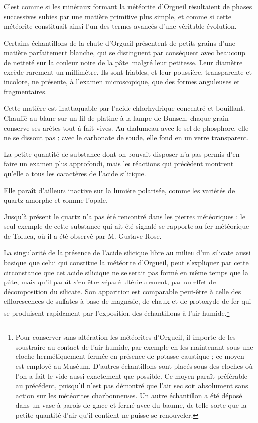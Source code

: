 \documentclass[a4paper, 11pt, oneside, polutonikogreek, french]{article}
\begin{document}
C'est comme si les minéraux formant la météorite d'Orgueil résultaient de phases successives subies par une matière primitive plus simple, et comme si cette météorite constituait ainsi l'un des termes avancés d'une véritable évolution.

Certains échantillons de la chute d'Orgueil présentent de petits grains d'une matière parfaitement blanche, qui se distinguent par conséquent avec beaucoup de netteté sur la couleur noire de la pâte, malgré leur petitesse. Leur diamètre excède rarement un millimètre. Ils sont friables, et leur poussière, transparente et incolore, ne présente, à l'examen microscopique, que des formes anguleuses et fragmentaires.

Cette matière est inattaquable par l'acide chlorhydrique concentré et bouillant. Chauffé au blanc sur un fil de platine à la lampe de Bunsen, chaque grain conserve ses arêtes tout à fait vives. Au chalumeau avec le sel de phosphore, elle ne se dissout pas ; avec le carbonate de soude, elle fond en un verre transparent.

La petite quantité de substance dont on pouvait disposer n'a pas permis d'en faire un examen plus approfondi, mais les réactions qui précèdent montrent qu'elle a tous les caractères de l'acide silicique.

Elle paraît d'ailleurs inactive sur la lumière polarisée, comme les variétés de quartz amorphe et comme l'opale.

Jusqu'à présent le quartz n'a pas été rencontré dans les pierres météoriques : le seul exemple de cette substance qui ait été signalé se rapporte au fer météorique de Toluca, où il a été observé par M. Gustave Rose.

La singularité de la présence de l'acide silicique libre au milieu d'un silicate aussi basique que celui qui constitue la météorite d'Orgueil, peut s'expliquer par cette circonstance que cet acide silicique ne se serait pas formé en même temps que la pâte, mais qu'il paraît s'en être séparé ultérieurement, par un effet de décomposition du silicate. Son apparition est comparable peut-être à celle des efflorescences de sulfates à base de magnésie, de chaux et de protoxyde de fer qui se produisent rapidement par l'exposition des échantillons à l'air humide.\footnote{Pour conserver sans altération les météorites d'Orgueil, il importe de les soustraire au contact de l'air humide, par exemple en les maintenant sous une cloche hermétiquement fermée en présence de potasse caustique ; ce moyen est employé au Muséum. D'autres échantillons sont placés sous des cloches où l'on a fait le vide aussi exactement que possible. Ce moyen paraît préférable au précédent, puisqu'il n'est pas démontré que l'air sec soit absolument sans action sur les météorites charbonneuses. Un autre échantillon a été déposé dans un vase à parois de glace et fermé avec du baume, de telle sorte que la petite quantité d'air qu'il contient ne puisse se renouveler.}
\end{document}
